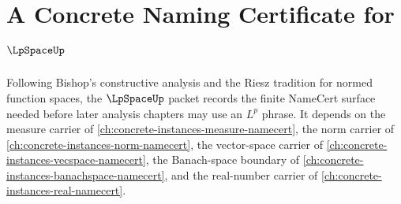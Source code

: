 \chapter{A Concrete Naming Certificate for $\LpSpaceUp$}
\label{ch:concrete-instances-lp-space-namecert}

Following Bishop's constructive analysis and the Riesz tradition for normed function spaces, the $\LpSpaceUp$ packet records the finite NameCert surface needed before later analysis chapters may use an $L^p$ phrase. It depends on the measure carrier of \autoref{ch:concrete-instances-measure-namecert}, the norm carrier of \autoref{ch:concrete-instances-norm-namecert}, the vector-space carrier of \autoref{ch:concrete-instances-vecspace-namecert}, the Banach-space boundary of \autoref{ch:concrete-instances-banachspace-namecert}, and the real-number carrier of \autoref{ch:concrete-instances-real-namecert}.


